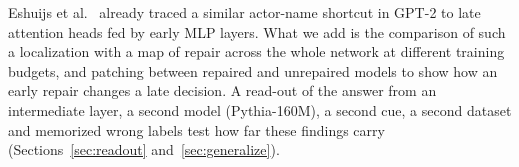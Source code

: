 Eshuijs et al.~\cite{eshuijs2025short} already traced a similar actor-name shortcut in GPT-2 to late attention heads
fed by early MLP layers. What we add is the comparison of such a localization with a map of repair across the whole
network at different training budgets, and patching between repaired and unrepaired models to show how an early repair
changes a late decision. A read-out of the answer from an intermediate layer, a second model (Pythia-160M), a second
cue, a second dataset and memorized wrong labels test how far these findings carry (Sections~\ref{sec:readout}
and~\ref{sec:generalize}).
